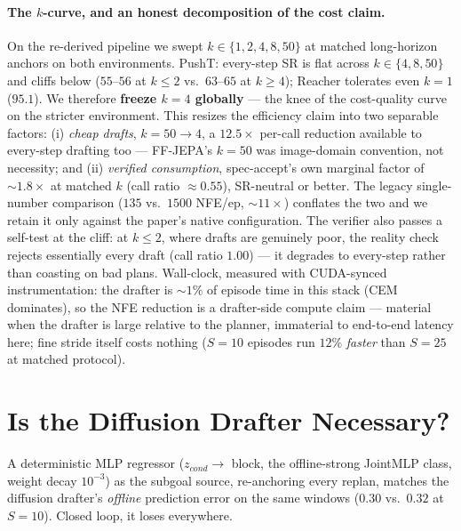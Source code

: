 \documentclass{article}
\begin{document}
\paragraph{The $k$-curve, and an honest decomposition of the cost claim.} On the
re-derived pipeline we swept $k\in\{1,2,4,8,50\}$ at matched long-horizon anchors on
both environments. PushT: every-step SR is flat across $k\in\{4,8,50\}$ and cliffs
below ($55$--$56$ at $k\leq2$ vs.\ $63$--$65$ at $k\geq4$); Reacher tolerates even
$k{=}1$ ($95.1$). We therefore \textbf{freeze $k{=}4$ globally} --- the knee of the
cost-quality curve on the stricter environment. This resizes the efficiency claim into
two separable factors: (i) \emph{cheap drafts}, $k{=}50\to4$, a $12.5\times$ per-call
reduction available to every-step drafting too --- FF-JEPA's $k{=}50$ was image-domain
convention, not necessity; and (ii) \emph{verified consumption}, spec-accept's own
marginal factor of ${\sim}1.8\times$ at matched $k$ (call ratio ${\approx}0.55$),
SR-neutral or better. The legacy single-number comparison ($135$ vs.\ $1500$ NFE/ep,
${\sim}11\times$) conflates the two and we retain it only against the paper's native
configuration. The verifier also passes a self-test at the cliff: at $k\leq2$, where
drafts are genuinely poor, the reality check rejects essentially every draft (call
ratio $1.00$) --- it degrades to every-step rather than coasting on bad plans.
Wall-clock, measured with CUDA-synced instrumentation: the drafter is ${\sim}1\%$ of
episode time in this stack (CEM dominates), so the NFE reduction is a drafter-side
compute claim --- material when the drafter is large relative to the planner, immaterial
to end-to-end latency here; fine stride itself costs nothing ($S{=}10$ episodes run
$12\%$ \emph{faster} than $S{=}25$ at matched protocol).

\section{Is the Diffusion Drafter Necessary?}
\label{sec:regress}

A deterministic MLP regressor ($z_{cond}\to$ block, the offline-strong JointMLP class,
weight decay $10^{-3}$) as the subgoal source, re-anchoring every replan, matches the
diffusion drafter's \emph{offline} prediction error on the same windows ($0.30$ vs.\
$0.32$ at $S{=}10$). Closed loop, it loses everywhere.
\end{document}
